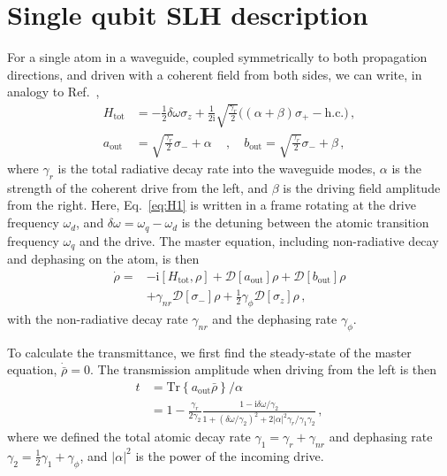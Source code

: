 \documentclass[pra, twocolumn, amsmath, amssymb, notitlepage, longbibliography, showpacs, superscriptaddress]{revtex4-1}
\newcommand{\ii}{\mathrm{i}}			             			%
\newcommand{\comm}[2]{\left[ #1, #2 \right]} 				%
\newcommand{\nn}{\nonumber}							%
\newcommand{\abss}[1]{\ensuremath{ \left| #1 \right|^{2} }}	%
\newcommand{\diss}[1]{\mathcal{D}[ #1 ]}					%
\renewcommand{\l}[0]{\left}
\renewcommand{\r}[0]{\right}
\newcommand{\Tr}{\text{Tr}}
\begin{document}
\section{Single qubit SLH description}

For a single atom in a waveguide, coupled symmetrically to 
both propagation directions, and driven with a coherent field 
from both sides, we can write, in analogy to Ref.~\cite{Muller2017a},
\begin{align}
	H_\textrm{tot} &= -\frac12 \delta\omega \sigma_{z} + \frac{1}{2\ii} \sqrt{\frac{\gamma_{r}}{2}} \bigl( ( \alpha + \beta ) \sigma_{+}  - \text{h.c.} \bigr) \,,\label{eq:H1}\\
	a_{\text{out}} &= \sqrt{\frac{\gamma_{r}}{2}} \sigma_{-} + \alpha \quad \,, \quad	b_{\text{out}} = \sqrt{\frac{\gamma_{r}}{2}} \sigma_{-} + \beta \,,
\end{align}
where $\gamma_{r}$ is the total radiative decay rate into the waveguide modes, $\alpha$ is the strength of the coherent drive from the left, and $\beta$ is the driving field amplitude from the right. 
Here, Eq.~\eqref{eq:H1} is written in a frame  rotating at the drive 
frequency $\omega_{d}$, and $\delta\omega = \omega_{q}- \omega_{d}$ 
is the detuning between the atomic transition frequency $\omega_{q}$ and the drive.
The master equation, including non-radiative decay and dephasing on the atom, is then
\begin{align}
	\dot \rho =& -\ii \comm{H_\textrm{tot}}{\rho} + \diss{a_{\text{out}}}\rho + \diss{b_{\text{out}}}\rho \nn\\
		&+ \gamma_{nr} \diss{\sigma_{-}}\rho + \frac12 \gamma_{\phi} \diss{\sigma_{z}}\rho \,,
\end{align}
with the non-radiative decay rate $\gamma_{nr}$ and the dephasing rate $\gamma_{\phi}$.

To calculate the transmittance, we first find the steady-state of the master equation, $\dot {\bar \rho} =0$.
The transmission amplitude when driving from the left is then
\begin{align}
	t &= \Tr\l\{ a_{\text{out}} \bar\rho\r\} / \alpha \nn\\
		&= 1-\frac{\gamma_{r}}{2\gamma_{2}} \frac{1-\ii {\delta\omega}/{\gamma_{2}}}{1+({\delta\omega}/{\gamma_{2}})^{2} + { 2\abss\alpha\gamma_{r}}/{\gamma_{1} \gamma_{2}}} \,, \label{eq:t1}
\end{align}
where we defined the total atomic decay rate $\gamma_{1} = \gamma_{r} + \gamma_{nr}$ and dephasing rate $\gamma_{2} = \frac12 \gamma_{1} + \gamma_{\phi}$, 
and $|\alpha|^2$ is the power of the incoming drive.
\end{document}

